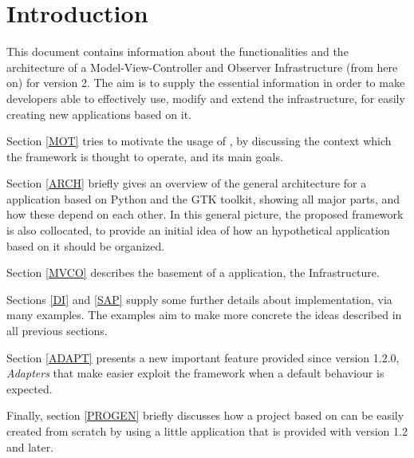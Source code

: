 \section{Introduction}

This document contains information about the functionalities and the
architecture of a Model-View-Controller and Observer Infrastructure
(\mvco from here on) for \pygtk version 2. The aim is to supply the
essential information in order to make developers able to effectively
use, modify and extend the infrastructure, for easily creating
new applications based on it.

\bigskip

Section \ref{MOT} tries to motivate the usage of \pygtkmvc, by
discussing the context which the framework is thought to operate, and
its main goals.

Section \ref{ARCH} briefly gives an overview of the general
architecture for a \gui application based on Python and the GTK
toolkit, showing all major parts, and how these depend on each other.
In this general picture, the proposed \mvco framework is also
collocated, to provide an initial idea of how an hypothetical
application based on it should be organized.

Section \ref{MVCO} describes the basement of a \gui application, the
\mvco Infrastructure. 

Sections \ref{DI} and \ref{SAP} supply some further details
about implementation, via many examples. The examples aim to make more
concrete the ideas described in all previous sections.

Section \ref{ADAPT} presents a new important feature provided since
version 1.2.0, \emph{Adapters} that make easier exploit the
framework when a default behaviour is expected. 

Finally, section \ref{PROGEN} briefly discusses how a project based on
\mvco can be easily created from scratch by using a little application
that is provided with version 1.2 and later.
